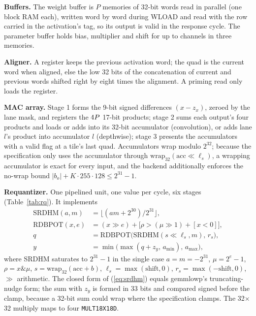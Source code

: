 \documentclass[journal]{IEEEtran}
\begin{document}
\textbf{Buffers.} The weight buffer is $P$ memories of \WbufRows{} 32-bit words read in parallel (one block RAM each), written word by word during WLOAD and read with the row carried in the activation's tag, so its output is valid in the response cycle. The parameter buffer holds bias, multiplier and shift for up to \WbufRows{} channels in three memories.

\textbf{Aligner.} A register keeps the previous activation word; the quad is the current word when aligned, else the low 32 bits of the concatenation of current and previous words shifted right by eight times the alignment. A priming read only loads the register.

\textbf{MAC array.} Stage 1 forms the 9-bit signed differences $(x-z_x)$, zeroed by the lane mask, and registers the $4 P$ 17-bit products; stage 2 sums each output's four products and loads or adds into its 32-bit accumulator (convolution), or adds lane $l$'s product into accumulator $l$ (depthwise); stage 3 presents the accumulators with a valid flag at a tile's last quad. Accumulators wrap modulo $2^{32}$; because the specification only uses the accumulator through $\mathrm{wrap}_{32}(\mathrm{acc} \ll \ell_s)$, a wrapping accumulator is exact for every input, and the backend additionally enforces the no-wrap bound $|b_o| + K\cdot255\cdot128 \le 2^{31}-1$.

\textbf{Requantizer.} One pipelined unit, one value per cycle, six stages (Table~\ref{tab:rq}). It implements
\begin{align}
\mathrm{SRDHM}(a,m) &= \bigl\lfloor (a m + 2^{30})/2^{31}\bigr\rfloor,\label{eq:srdhm}\\
\mathrm{RDBPOT}(x,e) &= (x \gg e) + \bigl[\rho > (\mu \gg 1) + [x<0]\bigr],\label{eq:rdbpot}\\
q &= \mathrm{RDBPOT}\bigl(\mathrm{SRDHM}(s \ll \ell_s, m),\, r_s\bigr),\nonumber\\
y &= \min\bigl(\max(q+z_y,\, a_{\min}),\, a_{\max}\bigr),\nonumber
\end{align}
where SRDHM saturates to $2^{31}-1$ in the single case $a=m=-2^{31}$, $\mu = 2^e-1$, $\rho = x \mathbin{\&} \mu$, $s = \mathrm{wrap}_{32}(\mathrm{acc}+b)$, $\ell_s=\max(\mathrm{shift},0)$, $r_s=\max(-\mathrm{shift},0)$, $\gg$ arithmetic. The closed form of (\ref{eq:srdhm}) equals gemmlowp's truncating-nudge form; the sum with $z_y$ is formed in 33 bits and compared signed before the clamp, because a 32-bit sum could wrap where the specification clamps. The 32$\times$32 multiply maps to four \texttt{MULT18X18D}.
\end{document}
